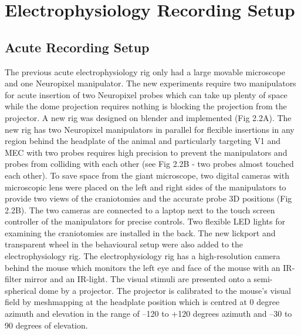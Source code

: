 \section{Electrophysiology Recording Setup}
\subsection{Acute Recording Setup}
The previous acute electrophysiology rig only had a large movable microscope and one Neuropixel manipulator. The new experiments require two manipulators for acute insertion of two Neuropixel probes which can take up plenty of space while the dome projection requires nothing is blocking the projection from the projector. A new rig was designed on blender and implemented (Fig 2.2A). The new rig has two Neuropixel manipulators in parallel for flexible insertions in any region behind the headplate of the animal and particularly targeting V1 and MEC with two probes requires high precision to prevent the manipulators and probes from colliding with each other (see Fig 2.2B - two probes almost touched each other). To save space from the giant microscope, two digital cameras with microscopic lens were placed on the left and right sides of the manipulators to provide two views of the craniotomies and the accurate probe 3D positions (Fig 2.2B). The two cameras are connected to a laptop next to the touch screen controller of the manipulators for precise controls. Two flexible LED lights for examining the craniotomies are installed in the back. The new lickport and transparent wheel in the behavioural setup were also added to the electrophysiology rig. The electrophysiology rig has a high-resolution camera behind the mouse which monitors the left eye and face of the mouse with an IR-filter mirror and an IR-light. The visual stimuli are presented onto a semi-spherical dome by a projector. The projector is calibrated to the mouse’s visual field by meshmapping at the headplate position which is centred at 0 degree azimuth and elevation in the range of –120 to +120 degrees azimuth and –30 to 90 degrees of elevation. 

